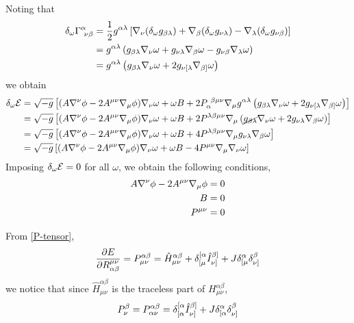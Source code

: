 Noting that
\begin{align}
  \delta_\omega \Gamma^\alpha_{~\nu\beta }&=\frac{1}{2}g^{\alpha\lambda}\left[\nabla_\nu (\delta_\omega g_{\beta\lambda})+\nabla_\beta (\delta_\omega g_{\nu\lambda})-\nabla_\lambda(\delta_\omega g_{\nu\beta })\right]\\
  &=g^{\alpha\lambda}\left(g_{\beta\lambda}\nabla_\nu\omega +g_{\nu\lambda}\nabla_\beta\omega-g_{\nu\beta }\nabla_\lambda\omega\right)\\
  &=g^{\alpha\lambda}\left(g_{\beta\lambda}\nabla_\nu\omega +2g_{\nu[\lambda}\nabla_{\beta]}\omega\right)
\end{align}
we obtain
\begin{align*}
  \delta_\omega\mathcal{E}&=\sqrt{-g}\left[(A\nabla^\nu \phi -2A^{\mu\nu }\nabla_\mu\phi )\nabla_\nu \omega+\omega B+2P_\alpha ^{~\beta\mu\nu }\nabla_{\mu }g^{\alpha\lambda}\left(g_{\beta\lambda}\nabla_\nu\omega +2g_{\nu[\lambda}\nabla_{\beta]}\omega\right)\right]\\
  &=\sqrt{-g}\left[(A\nabla^\nu \phi -2A^{\mu\nu }\nabla_\mu\phi )\nabla_\nu \omega+\omega B+2P ^{\lambda\beta\mu\nu }\nabla_{\mu }\left(\cancel{g_{\beta\lambda}}\nabla_\nu\omega +2g_{\nu\lambda}\nabla_{\beta}\omega\right)\right]\\
  &=\sqrt{-g}\left[(A\nabla^\nu \phi -2A^{\mu\nu }\nabla_\mu\phi )\nabla_\nu \omega+\omega B+4P^{\lambda\beta\mu\nu }\nabla_{\mu }g_{\nu\lambda}\nabla_{\beta}\omega\right]\\
  &=\sqrt{-g}\left[(A\nabla^\nu \phi -2A^{\mu\nu }\nabla_\mu\phi )\nabla_\nu \omega+\omega B-4P^{\mu\nu }\nabla_{\mu }\nabla_{\nu }\omega\right]
\end{align*}
Imposing $\delta_\omega\mathcal{E}=0$ for all $\omega$, we obtain the following conditions,
\begin{subequations}\label{conditions}
	\begin{align}
 \label{A-condition} A\nabla^\nu \phi-2A^{\mu\nu }\nabla_\mu \phi&=0\\
  \label{B-condition} B&=0\\
 \label{P-condition} P^{\mu\nu }&=0
\end{align}
\end{subequations}
 
From \eqref{P-tensor},
\begin{equation}\label{dEdP}
    \pdv{E}{R^{\mu\nu}_{\alpha\beta}}= P^{\alpha\beta}_{\mu\nu}=\hat{H}^{\alpha\beta}_{\mu\nu}+\delta^{[\alpha}_{[\mu}\hat{I}^{\beta]}_{\nu]}+J\delta^\alpha_{[\mu}\delta^\beta_{\nu]}
\end{equation}
we notice that since $\hat{H}^{\alpha\beta}_{\mu\nu}$ is the traceless part of $H^{\alpha\beta}_{\mu\nu}$,
\begin{equation}
  P^\beta_\nu =P^{\alpha\beta }_{\alpha\nu }=\delta^{[\alpha}_{[\alpha }\hat{I}^{\beta]}_{\nu]}+J\delta^\alpha_{[\alpha }\delta^\beta_{\nu]}
\end{equation}

